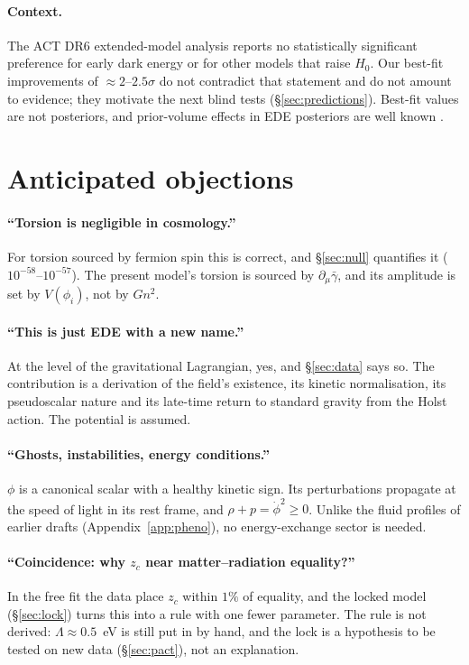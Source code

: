 \documentclass[11pt]{article}
\begin{document}
\paragraph{Context.} The ACT DR6 extended-model analysis \cite{calabrese2025} reports no
statistically significant preference for early dark energy or for other models that raise
$H_0$. Our best-fit improvements of $\approx2$--$2.5\sigma$ do not contradict that statement and do
not amount to evidence; they motivate the next blind tests (\S\ref{sec:predictions}). Best-fit
values are not posteriors, and prior-volume effects in EDE posteriors are well known
\cite{poulin2025}.

\section{Anticipated objections}\label{sec:objections}

\paragraph{``Torsion is negligible in cosmology.''} For torsion sourced by fermion spin
this is correct, and \S\ref{sec:null} quantifies it ($10^{-58}$--$10^{-57}$). The present model's
torsion is sourced by $\partial_\mu\bar\gamma$, and its amplitude is set by $V(\phi_i)$,
not by $Gn^2$.

\paragraph{``This is just EDE with a new name.''} At the level of the gravitational
Lagrangian, yes, and \S\ref{sec:data} says so. The contribution is a derivation of the
field's existence, its kinetic normalisation, its pseudoscalar nature and its
late-time return to standard gravity from the Holst action. The potential is assumed.

\paragraph{``Ghosts, instabilities, energy conditions.''} $\phi$ is a canonical scalar
with a healthy kinetic sign. Its perturbations propagate at the speed of light in its rest
frame, and $\rho+p=\dot\phi^2\ge0$. Unlike the fluid profiles of earlier drafts
(Appendix~\ref{app:pheno}), no energy-exchange sector is needed.

\paragraph{``Coincidence: why $z_c$ near matter--radiation equality?''} In the free fit the
data place $z_c$ within $1\%$ of equality, and the locked model (\S\ref{sec:lock}) turns this
into a rule with one fewer parameter. The rule is not derived: $\Lambda\approx0.5$~eV is
still put in by hand, and the lock is a hypothesis to be tested on new data
(\S\ref{sec:pact}), not an explanation.
\end{document}
